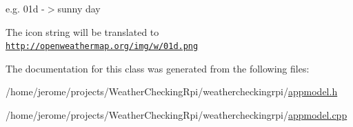 e.\+g. 01d -\/$>$sunny day

The icon string will be translated to \href{http://openweathermap.org/img/w/01d.png}{\tt http\+://openweathermap.\+org/img/w/01d.\+png} 

The documentation for this class was generated from the following files\+:\begin{DoxyCompactItemize}
\item 
/home/jerome/projects/\+Weather\+Checking\+Rpi/weathercheckingrpi/\hyperlink{appmodel_8h}{appmodel.\+h}\item 
/home/jerome/projects/\+Weather\+Checking\+Rpi/weathercheckingrpi/\hyperlink{appmodel_8cpp}{appmodel.\+cpp}\end{DoxyCompactItemize}
